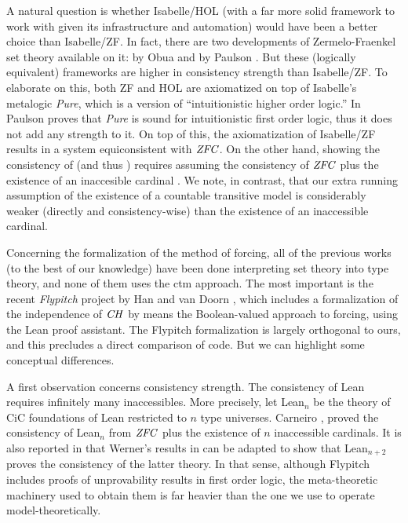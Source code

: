 A natural question is whether Isabelle/HOL (with a far more solid
framework to work with given its infrastructure and automation) would
have been a better choice than Isabelle/ZF. In fact,
there are two developments of Zermelo-Fraenkel set theory available on
it:  by Obua \cite{DBLP:conf/ictac/Obua06} and
 by Paulson
\cite{ZFC_in_HOL-AFP}. But these (logically equivalent) frameworks are
higher in consistency strength than Isabelle/ZF. To elaborate on this,
both ZF and HOL are axiomatized on top of Isabelle's metalogic
\emph{Pure}, which is a version of ``intuitionistic higher order
logic.'' In  \cite{Paulson1989} Paulson proves that \emph{Pure}
is sound for intuitionistic first order logic, thus it does not add
any strength to it. On top of this, the axiomatization of Isabelle/ZF
results in a system equiconsistent with $\mathit{ZFC}$. On the other hand,
showing the consistency of  (and thus
) requires
assuming the consistency of $\mathit{ZFC}$ plus the existence of an
inaccesible cardinal \cite[Sect.~3]{DBLP:conf/ictac/Obua06}. We note,
in contrast, that our extra running assumption of the existence of a
countable transitive model is considerably weaker (directly and
consistency-wise) than the existence of an inaccessible cardinal.

Concerning the formalization of the method 
of forcing, all of the previous works (to the best of our knowledge)
have been done interpreting set theory into type theory, and
none of them uses the ctm approach. The
most important is the recent \emph{Flypitch} project  by 
Han and van Doorn
\cite{han_et_al:LIPIcs:2019:11074,DBLP:conf/cpp/HanD20}, which includes
a formalization of the independence of $\mathit{CH}$ by means
the Boolean-valued approach to forcing, using the Lean
proof assistant. The Flypitch
formalization is largely orthogonal to ours, and this
precludes a direct comparison of code. But we can
highlight some conceptual differences.

A first observation concerns consistency strength. The consistency of Lean requires infinitely many
inaccessibles. More precisely, let Lean$_n$ be the theory of CiC
foundations of Lean restricted to $n$ type universes.  Carneiro
\cite{carneiro-ms-thesis}, proved the consistency of Lean$_n$ from
$\mathit{ZFC}$ plus the existence of $n$ inaccessible cardinals. It is also
reported in \cite{carneiro-ms-thesis} that Werner's results in
\cite{10.5555/645869.668660} can be adapted to show that Lean$_{n+2}$
proves the consistency of the latter theory.
In that sense, although Flypitch includes proofs of
unprovability results in first order logic, the meta-theoretic
machinery used to obtain them is far heavier than the one we use to
operate model-theoretically.
 
